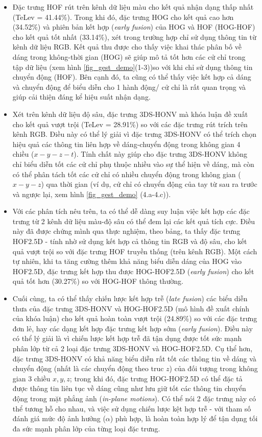 \begin{itemize}
\item Đặc trưng HOF rút trên kênh dữ liệu màu cho kết quả nhận dạng thấp nhất (TeLev = 41.44\%). Trong khi đó, đặc trưng HOG cho kết quả cao hơn (34.52\%) và phiên bản kết hợp (\textit{early fusion}) của HOG và HOF (HOG-HOF) cho kết quả tốt nhất (33.14\%), xét trong trường hợp chỉ sử dụng thông tin từ kênh dữ liệu RGB. Kết quả thu được cho thấy việc khai thác phân bố về dáng trong không-thời gian (HOG) sẽ giúp mô tả tốt hơn các cử chỉ trong tập dữ liệu (xem hình \ref{fig_gest_demo}(1-3))so với khi chỉ sử dụng thông tin chuyển động (HOF). Bên cạnh đó, ta cũng có thể thấy việc kết hợp cả dáng và chuyển động để biểu diễn cho 1 hành động/ cử chỉ là rất quan trọng và giúp cải thiện đáng kể hiệu suất nhận dạng. 
\item Xét trên kênh dữ liệu độ sâu, đặc trưng 3DS-HONV mà khóa luận đề xuất cho kết quả vượt trội (TeLev = 28.91\%) so với các đặc trưng rút trích trên kênh RGB. Điều này có thể lý giải vì đặc trưng 3DS-HONV có thể trích chọn hiệu quả các thông tin liên hợp về dáng-chuyển động trong không gian 4 chiều ($x-y-z-t$). Tính chất này giúp cho đặc trưng 3DS-HONV không chỉ biểu diễn tốt các cử chỉ phụ thuộc nhiều vào sự thể hiện về dáng, mà còn có thể phân tách tốt các cử chỉ có nhiều chuyển động trong không gian ($x-y-z$) qua thời gian (ví dụ, cử chỉ có chuyển động của tay từ sau ra trước và ngược lại, xem hình \ref{fig_gest_demo} (4.a-4.c)).
\item Với các phân tích nêu trên, ta có thể dễ dàng suy luận việc kết hợp các đặc trưng từ 2 kênh dữ liệu màu-độ sâu có thể đem lại các kết quả tích cực. Điều này đã được chứng mình qua thực nghiệm, theo bảng, ta thấy đặc trưng HOF2.5D - tính nhờ sử dụng kết hợp cả thông tin RGB và độ sâu, cho kết quả vượt trội so với đặc trưng HOF truyền thống (trên kênh RGB). Một cách tự nhiên, khi ta tăng cường thêm khả năng biểu diễn dáng của HOG vào HOF2.5D, đặc trưng kết hợp thu được HOG-HOF2.5D (\textit{early fusion}) cho kết quả tốt hơn (30.27\%) so với HOG-HOF thông thường. 
\item Cuối cùng, ta có thể thấy chiến lược kết hợp trễ (\textit{late fusion}) các biểu diễn thưa của đặc trưng 3DS-HONV và HOG-HOF2.5D (mô hình đề xuất chính của khóa luận) cho kết quả hoàn toàn vượt trội (24.89\%) so với các đặc trưng đơn lẻ, hay các dạng kết hợp đặc trưng kết hợp sớm (\textit{early fusion}). Điều này có thể lý giải là vì chiến lược kết hợp trễ đã tận dụng được tốt sức mạnh phân lớp từ cả 2 loại đặc trưng 3DS-HONV và HOG-HOF2.5D. Cụ thể hơn, đặc trưng 3DS-HONV có khả năng biểu diễn rất tốt các thông tin về dáng và chuyển động (nhất là các chuyển động theo truc $z$) của đối tượng trong không gian 3 chiều $x,y,z$; trong khi đó, đặc trưng HOG-HOF2.5D có thể đặc tả được thông tin liên tục về dáng cũng như lưu giữ tốt các thông tin chuyển động trong mặt phẳng ảnh (\textit{in-plane motions}). Có thể nói 2 đặc trưng này có thể tương hỗ cho nhau, và việc sử dụng chiến lược kệt hợp trễ - với tham số đánh giá mức độ ảnh hưởng ($\alpha$) phù hợp, là hoàn toàn hợp lý để tận dụng tối đa sức mạnh phân lớp của từng loại đặc trưng. 
\end{itemize}

